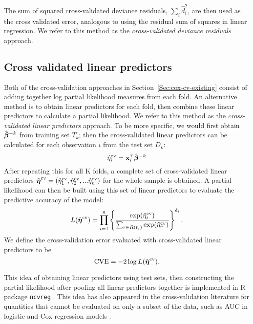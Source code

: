 The sum of squared cross-validated deviance residuals, $\sum_{i}\hat{d}_{i}^2$, are then used as the cross validated error, analogous to using the residual sum of squares in linear regression. We refer to this method as the \emph{cross-validated deviance residuals} approach.

\subsection{Cross validated linear predictors}
\label{Sec:linear-predictor}

Both of the cross-validation approaches in Section~\ref{Sec:cox-cv-existing} consist of adding together log partial likelihood measures from each fold.  An alternative method is to obtain linear predictors for each fold, then combine these linear predictors to calculate a partial likelihood. We refer to this method as the \emph{cross-validated linear predictors} approach. To be more specific, we would first obtain $\bbh^{-k}$ from training set $T_{k}$; then the cross-validated linear predictors can be calculated for each observation $i$ from the test set $D_k$:  
\begin{equation}
  \label{eq:cv-lp}
  \hat{\eta}^{\text{cv}}_{i} = \x_i\Tr\bbh^{-k}
\end{equation} 
After repeating this for all K folds, a complete set of cross-validated linear predictors $\hat{\boldsymbol\eta}^{\text{cv}} = ( \hat{\eta}^{\text{cv}}_{1},  \hat{\eta}^{\text{cv}}_{2} , ...  \hat{\eta}^{\text{cv}}_{n})$ for the whole sample is obtained. A partial likelihood can then be built using this set of linear predictors to evaluate the predictive accuracy of the model:
\begin{equation*}
  L(\hat{\boldsymbol\eta}^{\text{cv}}) = \prod_{i=1}^{n} \left\{ \frac{\exp (\hat{\eta}^{\text{cv}}_{i})}{\sum_{r \in R(t_{i})}\exp (\hat{\eta}^{\text{cv}}_r)} \right\} ^{\delta_i}.
\end{equation*}
We define the cross-validation error evaluated with cross-validated linear predictors to be $$\textrm{CVE} = - 2 \log L(\hat{\boldsymbol\eta}^{\text{cv}}).$$
  
This idea of obtaining linear predictors using test sets, then constructing the partial likelihood after pooling all linear predictors together is implemented in R package \texttt{ncvreg} \citep{ncvreg}. This idea has also appeared in the cross-validation literature for quantities that cannot be evaluated on only a subset of the data, such as AUC in logistic and Cox regression models \citep{Parker2007,Simon2011a,Subramanian2011}.

